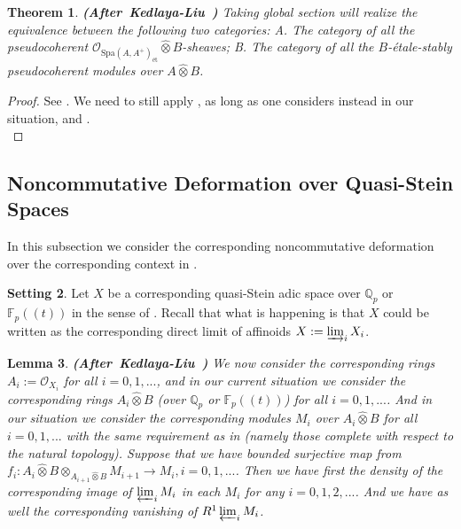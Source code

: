 \documentclass[12pt]{amsart}
\newtheorem{theorem}{Theorem}[section]
\newtheorem{lemma}[theorem]{Lemma}
\theoremstyle{definition}
\numberwithin{equation}{section}
\newtheorem{setting}[theorem]{Setting}
\begin{document}
\begin{theorem}\mbox{\bf{(After Kedlaya-Liu \cite[Theorem 2.5.14]{KL2})}} \label{theorem2.22}
Taking global section will realize the equivalence between the following two categories: A. The category of all the pseudocoherent $\mathcal{O}_{\mathrm{Spa}(A,A^+)_{\text{\'et}}}\widehat{\otimes}B$-sheaves; B. The category of all the $B$-\'etale-stably pseudocoherent modules over $A\widehat{\otimes}B$. 	
\end{theorem}


\begin{proof}
See \cite[Theorem 2.5.14]{KL2}. We need to still apply \cite[Theorem 8.2.22]{KL1}, as long as one considers instead in our situation, and \cite[Tag 03OD]{SP}.\\	
\end{proof}




\subsection{Noncommutative Deformation over Quasi-Stein Spaces}

\indent In this subsection we consider the corresponding noncommutative deformation over the corresponding context in \cite[Chapter 2.6]{KL2}.

\begin{setting}
Let $X$ be a corresponding quasi-Stein adic space over $\mathbb{Q}_p$ or $\mathbb{F}_p((t))$ in the sense of \cite[Definition 2.6.2]{KL2}. Recall that what is happening is that $X$ could be written as the corresponding direct limit of affinoids $X:=\varinjlim_i X_i$.\\ 	
\end{setting}



\begin{lemma} \mbox{\bf{(After Kedlaya-Liu \cite[Lemma 2.6.3]{KL2})}} \label{lemma2.24}
We now consider the corresponding rings $A_i:=\mathcal{O}_{X_i}$ for all $i=0,1,...$, and in our current situation we consider the corresponding rings $A_i\widehat{\otimes}B$ (over $\mathbb{Q}_p$ or $\mathbb{F}_p((t))$) for all $i=0,1,...$. And in our situation we consider the corresponding modules $M_i$ over $A_i\widehat{\otimes}B$ for all $i=0,1,...$ with the same requirement as in \cite[Lemma 2.6.3]{KL2} (namely those complete with respect to the natural topology). Suppose that we have bounded surjective map from $f_i:A_{i}\widehat{\otimes}B\otimes_{A_{i+1}\widehat{\otimes}B} M_{i+1}\rightarrow M_i,i=0,1,...$. Then we have first the density of the corresponding image of $\varprojlim_i M_i$ in each $M_i$ for any $i=0,1,2,...$. And we have as well the corresponding vanishing of $R^1\varprojlim_i M_i$.
\end{lemma}
\end{document}
